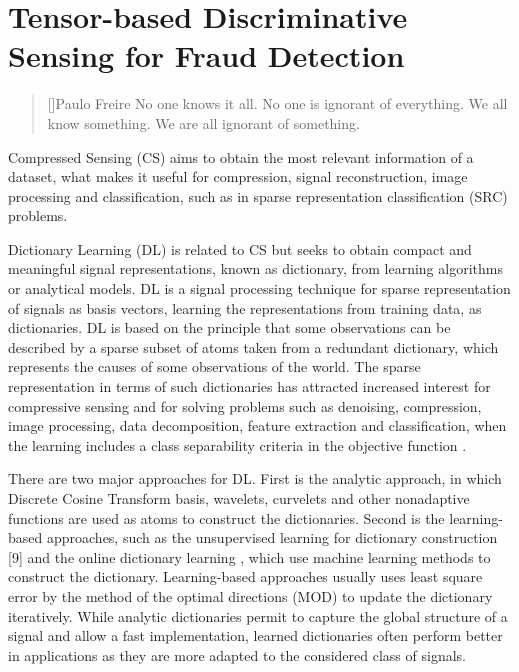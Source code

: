 \chapter{Tensor-based Discriminative Sensing for Fraud Detection}
\label{ch:4_tensor_dl}

\begin{quotation}[]{Paulo Freire}
No one knows it all. No one is ignorant of everything. We all know something. We are all ignorant of something.
\end{quotation}


Compressed Sensing (CS) aims to obtain the most relevant information of a dataset, what makes it useful for compression, signal reconstruction, image processing and classification, such as in sparse representation classification (SRC) problems. 

Dictionary Learning (DL) is related to CS but seeks to obtain compact and meaningful signal representations, known as dictionary, from learning algorithms or analytical models. DL is a signal processing technique for sparse representation of signals as basis vectors, learning the representations from training data, as dictionaries. DL is based on the principle that some observations can be described by a sparse subset of atoms taken from a redundant dictionary, which represents the causes of some observations of the world. The sparse representation in terms of such dictionaries has attracted increased interest for compressive sensing and for solving problems such as denoising, compression, image processing, data decomposition, feature extraction and classification, when the learning includes a class separability criteria in the objective function \cite{tosic2011dictionary, zhang2010discriminative, zhu2016coupled,ravishankar2011mr}.

There are two major approaches for DL. First is the analytic approach, in which Discrete Cosine Transform basis, wavelets, curvelets and other nonadaptive functions are used as atoms to construct the dictionaries. Second is the learning-based approaches, such as the unsupervised learning for dictionary construction [9] and the online dictionary learning \cite{mairal2009online}, which use machine learning methods to construct the dictionary. Learning-based approaches usually uses least square error by the method of the optimal directions (MOD) \cite{engan1999method} to update the dictionary iteratively. While analytic dictionaries permit to capture the global structure of a signal and allow a fast implementation, learned dictionaries often perform better in applications as they are more adapted to the considered class of signals.

